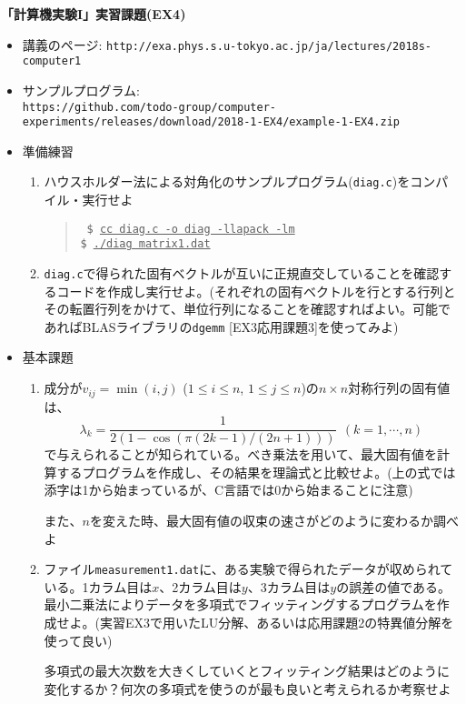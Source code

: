 \documentclass[11pt]{jarticle}
\begin{document}
\noindent
{\bf\large 「計算機実験I」実習課題(EX4)}
\\[-0.5em]

\noindent
\begin{itemize}
\item 講義のページ: \verb+http://exa.phys.s.u-tokyo.ac.jp/ja/lectures/2018s-computer1+

\item サンプルプログラム: \\ {\small \verb+https://github.com/todo-group/computer-experiments/releases/download/2018-1-EX4/example-1-EX4.zip+}
  
\item 準備練習
  \begin{enumerate}
  \item ハウスホルダー法による対角化のサンプルプログラム({\tt diag.c})をコンパイル・実行せよ
    \begin{quote} \tt
      \$ \underline{cc diag.c -o diag -llapack -lm} \\
      \$ \underline{./diag matrix1.dat}
    \end{quote}
  \item {\tt diag.c}で得られた固有ベクトルが互いに正規直交していることを確認するコードを作成し実行せよ。(それぞれの固有ベクトルを行とする行列とその転置行列をかけて、単位行列になることを確認すればよい。可能であればBLASライブラリの{\tt dgemm} [EX3応用課題3]を使ってみよ)
  \end{enumerate}

\item 基本課題
  \begin{enumerate}
  \item 成分が$v_{ij}=\min(i,j)$ ($1 \le i \le n$, $1 \le j \le n$)の$n \times n$対称行列の固有値は、
    \[ \lambda_k = \frac{1}{2 (1 - \cos (\pi (2 k - 1) / (2 n + 1)))} \ \ (k=1,\cdots,n)\]
    で与えられることが知られている。べき乗法を用いて、最大固有値を計算するプログラムを作成し、その結果を理論式と比較せよ。(上の式では添字は1から始まっているが、C言語では0から始まることに注意)

    また、$n$を変えた時、最大固有値の収束の速さがどのように変わるか調べよ
  \item ファイル{\tt measurement1.dat}に、ある実験で得られたデータが収められている。1カラム目は$x$、2カラム目は$y$、3カラム目は$y$の誤差の値である。最小二乗法によりデータを多項式でフィッティングするプログラムを作成せよ。(実習EX3で用いたLU分解、あるいは応用課題2の特異値分解を使って良い)

    多項式の最大次数を大きくしていくとフィッティング結果はどのように変化するか？何次の多項式を使うのが最も良いと考えられるか考察せよ


\end{enumerate}
\end{itemize}
\end{document}
